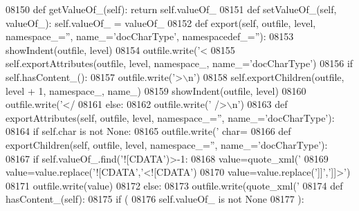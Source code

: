 \begin{DoxyCode}
{{{{{{{{{{{{{{{{{{{{{{{{{{{{{{{{{{{{{{{{{{{{{{{{{{{{{{{{{{{{{{{{{{{{{{{{{{{{{{{{{{{{{{{{{{{{{{{{{{{{{{{{{{{{{{{{{{{{{{{{{{{{{{{{{{{{{{{{{{{{{{{{{{{{{{{{{{{{{{{{{{{{{{{{{{{{{{{{{{{{{{{{{{{{{{{{{{{{{{{{{{{{{{{{{{{{{{{{{{{{{{{{{{{{{{{{{{{{{{{{{{{{{{{{{{{{{{{{{{{{{{{{{{{{{{{{{{{{{{{{{{{{{{{{{{{{{{{{{{{{{{{{{{{{{{{{{{{{{{{{{{{{{{{{{{{{{{{{{{{{{{{{{{{{{{{{{{{{{{{{{{{{{{{{{{{{{{{{{{{{{{{{{{{{{{{{{{{{{{{{{{{{{{{{{{{{{{{{{{{{{{{{{{{{{{{{{{{{{{{{{{{{{{{{{{{{{{{{{{{{{{{{{{{{{{{{{{{{{{{{{{{{{{{{{{{{{{{{08150     \textcolor{keyword}{def }getValueOf_(self): \textcolor{keywordflow}{return} self.valueOf\_
08151     \textcolor{keyword}{def }setValueOf_(self, valueOf\_): self.valueOf\_ = valueOf\_
08152     \textcolor{keyword}{def }export(self, outfile, level, namespace\_='', name\_='docCharType', namespacedef\_=''):
08153         showIndent(outfile, level)
08154         outfile.write(\textcolor{stringliteral}{'<%
08155         self.exportAttributes(outfile, level, namespace\_, name\_=\textcolor{stringliteral}{'docCharType'})
08156         \textcolor{keywordflow}{if} self.hasContent_():
08157             outfile.write(\textcolor{stringliteral}{'>\(\backslash\)n'})
08158             self.exportChildren(outfile, level + 1, namespace\_, name\_)
08159             showIndent(outfile, level)
08160             outfile.write(\textcolor{stringliteral}{'</%
08161         \textcolor{keywordflow}{else}:
08162             outfile.write(\textcolor{stringliteral}{' />\(\backslash\)n'})
08163     \textcolor{keyword}{def }exportAttributes(self, outfile, level, namespace\_='', name\_='docCharType'):
08164         \textcolor{keywordflow}{if} self.char \textcolor{keywordflow}{is} \textcolor{keywordflow}{not} \textcolor{keywordtype}{None}:
08165             outfile.write(\textcolor{stringliteral}{' char=%
08166     \textcolor{keyword}{def }exportChildren(self, outfile, level, namespace\_='', name\_='docCharType'):
08167         \textcolor{keywordflow}{if} self.valueOf\_.find(\textcolor{stringliteral}{'![CDATA'})>-1:
08168             value=quote_xml(\textcolor{stringliteral}{'%
08169             value=value.replace(\textcolor{stringliteral}{'![CDATA'},\textcolor{stringliteral}{'<![CDATA'})
08170             value=value.replace(\textcolor{stringliteral}{']]'},\textcolor{stringliteral}{']]>'})
08171             outfile.write(value)
08172         \textcolor{keywordflow}{else}:
08173             outfile.write(quote_xml(\textcolor{stringliteral}{'%
08174     \textcolor{keyword}{def }hasContent_(self):
08175         \textcolor{keywordflow}{if} (
08176             self.valueOf_ \textcolor{keywordflow}{is} \textcolor{keywordflow}{not} \textcolor{keywordtype}{None}
08177             ):
}}}}}}}}}}}}}}}}}}}}}}}}}}}}}}}}}}}}}}}}}}}}}}}}}}}}}}}}}}}}}}}}}}}}}}}}}}}}}}}}}}}}}}}}}}}}}}}}}}}}}}}}}}}}}}}}}}}}}}}}}}}}}}}}}}}}}}}}}}}}}}}}}}}}}}}}}}}}}}}}}}}}}}}}}}}}}}}}}}}}}}}}}}}}}}}}}}}}}}}}}}}}}}}}}}}}}}}}}}}}}}}}}}}}}}}}}}}}}}}}}}}}}}}}}}}}}}}}}}}}}}}}}}}}}}}}}}}}}}}}}}}}}}}}}}}}}}}}}}}}}}}}}}}}}}}}}}}}}}}}}}}}}}}}}}}}}}}}}}}}}}}}}}}}}}}}}}}}}}}}}}}}}}}}}}}}}}}}}}}}}}}}}}}}}}}}}}}}}}}}}}}}}}}}}}}}}}}}}}}}}}}}}}}}}}}}}}}}}}}}}}}}}}}}}}}}}}}}}}}}}}}}}}}}}}}}}}}}}}}}}}}}}}}}}}}}}}}}}}}}}
\end{DoxyCode}

